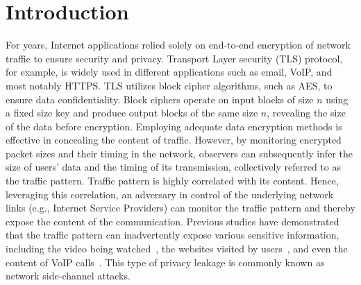 
\chapter{Introduction}
\label{ch:introduction}

For years, Internet applications relied solely on end-to-end encryption of network traffic to ensure security and privacy.
Transport Layer security (TLS) protocol, for example, is widely used in different applications such as email, VoIP, and most notably HTTPS.{\addref}
TLS utilizes block cipher algorithms, such as AES, to ensure data confidentiality.
Block ciphers operate on input blocks of size $n$ using a fixed size key and produce output blocks of the same size $n$, revealing the size of the data before encryption. {\addref}
Employing adequate data encryption methods is effective in concealing the content of traffic.
However, by monitoring encrypted packet sizes and their timing in the network, observers can subsequently infer the size of users' data and the timing of its transmission, collectively referred to as the traffic pattern.
Traffic pattern is highly correlated with its content.
Hence, leveraging this correlation, an adversary in control of the underlying network links (e.g., Internet Service Providers) can monitor the traffic pattern and thereby expose the content of the communication.
Previous studies have demonstrated that the traffic pattern can inadvertently expose various sensitive information, including the video being watched~\cite{schuster2017beautyburst}, the websites visited by users~\cite{wang2014supersequence, bhat2019varcnn}, and even the content of VoIP calls~\cite{white2011phonotactic}.
This type of privacy leakage is commonly known as network side-channel attacks.



